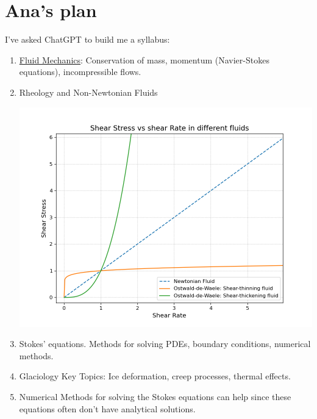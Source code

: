 \chapter{Ana's plan}\label{Intro}
I've asked ChatGPT to build me a syllabus:
\begin{enumerate}
    \item \href{https://www.youtube.com/watch?v=fa0zHI6nLUo&list=PLbMVogVj5nJTZJHsH6uLCO00I-ffGyBEm}{Fluid Mechanics}: Conservation of mass, momentum (Navier-Stokes equations), incompressible flows.
    \item Rheology and Non-Newtonian Fluids \begin{Figure}
    \centering
    \includegraphics[width=0.9\linewidth]{types_of_fluids.png}
    \label{fig:fluids_types}
    \end{Figure}
    \item Stokes' equations. Methods for solving PDEs, boundary conditions, numerical methods.
    \item Glaciology Key Topics: Ice deformation, creep processes, thermal effects.%
    \item Numerical Methods for solving the Stokes equations can help since these equations often don't have analytical solutions.
\end{enumerate}




